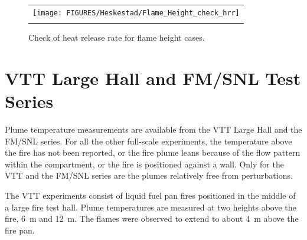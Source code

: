 \begin{figure}[p]
\begin{center}
\begin{tabular}{c}
\texttt{[image: FIGURES/Heskestad/Flame\_Height\_check\_hrr]} \\
\vspace{0.25in} \\
\end{tabular}
\end{center}
\caption[Check of heat release rate for flame height cases.]
{Check of heat release rate for flame height cases.}
\label{Flame_Height_check_hrr}
\end{figure}


\clearpage

\section{VTT Large Hall and FM/SNL Test Series}

\label{VTT_plume}

Plume temperature measurements are available from the VTT Large Hall and the FM/SNL series.
For all the other full-scale experiments, the temperature above the fire has not been reported, or the fire plume
leans because of the flow pattern within the compartment, or the fire is positioned against a wall.
Only for the VTT and the FM/SNL series are the plumes relatively free from perturbations.

The VTT experiments consist of liquid fuel pan fires positioned in the middle of a large fire test hall.
Plume temperatures are measured at two heights above the fire, 6~m and 12~m.
The flames were observed to extend to about 4~m above the fire pan.




